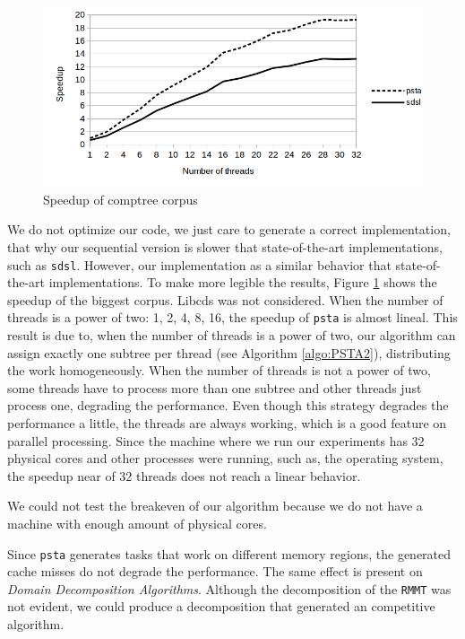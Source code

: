  	\begin{figure}[ht]
		\centering
		\includegraphics[scale=0.3]{./images/Speedup.png}
     	\caption{Speedup of comptree corpus}
		\label{fig:speedup} 
	\end{figure}

	We do not optimize our code, we just care to generate a correct implementation, that why our sequential version is slower that state-of-the-art implementations, such as \verb+sdsl+. However, our implementation as a similar behavior that state-of-the-art implementations. To make more legible the results, Figure \ref{fig:speedup} shows the speedup of the biggest corpus. Libcds was not considered. When the number of threads is a power of two: 1, 2, 4, 8, 16, the speedup of \verb+psta+ is almost lineal. This result is due to, when the number of threads is a power of two, our algorithm can assign exactly one subtree per thread (see Algorithm \ref{algo:PSTA2}), distributing the work homogeneously. When the number of threads is not a power of two, some threads have to process more than one subtree and other threads just process one, degrading the performance. Even though this strategy degrades the performance a little, the threads are always working, which is a good feature on parallel processing. Since the machine where we run our experiments has 32 physical cores and other processes were running, such as, the operating system, the speedup near of 32 threads does not reach a linear behavior. 

	We could not test the breakeven of our algorithm because we do not have a machine with enough amount of physical cores.

	Since {\tt psta} generates tasks that work on different memory regions, the generated cache misses do not degrade the performance. The same effect is present on \emph{Domain Decomposition Algorithms}. Although the decomposition of the {\tt RMMT} was not evident, we could produce a decomposition that generated an competitive algorithm.
	
